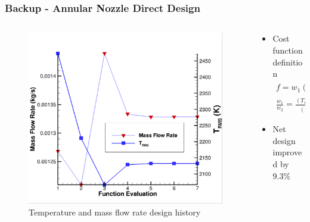 \documentclass{beamer}
\begin{document}
\section{}
\begin{frame}
  \frametitle{Backup - Annular Nozzle Direct Design}
  \begin{columns}
    \begin{column}{0.4\textwidth}
      \begin{figure}[h]
        \centering
        \includegraphics[width=\textwidth]{figures/direct_design/mass-tt.png}
        \caption{Temperature and mass flow rate design history}
        \label{fig:dd-temp-mass}
      \end{figure}
    \end{column}
    \begin{column}{0.6\textwidth}
      \begin{itemize}
        \item Cost function definition
          \begin{gather*}
            f = w_1 \left( T_{RMS} \right)^2 + w_2 \left( \dot{m} \right)^2 \\
            \frac{w_1}{w_2} = 
            \frac{\left (T_{RMS} \right)^2}{\left(\dot{m} \right)^2}
            \label{cost-func}
          \end{gather*}
        \item Net design improved by $9.3\%$
          \begin{table}

\end{table}
\end{itemize}
\end{column}
\end{columns}
\end{frame}
\end{document}
